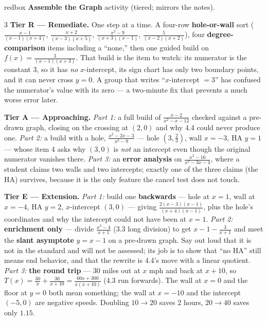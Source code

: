 \documentclass[10pt]{article}
\begin{document}
\begin{skillbox}{redbox}
\textbf{Assemble the Graph} activity (tiered; mirrors the notes).
\begin{multicols}{3}
\textbf{Tier R --- Remediate.} One step at a time. A four-row \textbf{hole-or-wall} sort
($\frac{x-1}{(x-1)(x+4)}$, $\frac{x+2}{(x-3)(x+5)}$, $\frac{x^2-9}{(x+3)(x-1)}$,
$\frac{5}{(x-2)(x+2)}$), four \textbf{degree-comparison} items including a ``none,'' then one guided
build on $f(x)=\frac{3}{(x-1)(x+3)}$. That build is the item to watch: its numerator is the constant
$3$, so it has \emph{no} $x$-intercept, its sign chart has only two boundary points, and it can never
cross $y=0$. A group that writes ``$x$-intercept $=3$'' has confused the numerator's value with its
zero --- a two-minute fix that prevents a much worse error later.

\columnbreak
\textbf{Tier A --- Approaching.} \emph{Part 1:} a full build of $\frac{x-2}{x^2-x-12}$ checked against
a pre-drawn graph, closing on the crossing at $(2,0)$ and why 4.4 could never produce one.
\emph{Part 2:} a build with a hole, $\frac{x^2-2x-3}{x^2-9}$ --- hole $(3,\frac23)$, wall $x=-3$,
HA $y=1$ --- whose item 4 asks why $(3,0)$ is \emph{not} an intercept even though the original
numerator vanishes there. \emph{Part 3:} an \textbf{error analysis} on $\frac{x^2-16}{x^2-3x-4}$, where
a student claims two walls and two intercepts; exactly one of the three claims (the HA) survives,
because it is the only feature the cancel test does not touch.

\columnbreak
\textbf{Tier E --- Extension.} \emph{Part 1:} build one \textbf{backwards} --- hole at $x=1$, wall at
$x=-4$, HA $y=2$, $x$-intercept $(3,0)$ --- giving $\frac{2(x-3)(x-1)}{(x+4)(x-1)}$, plus the hole's
coordinates and why the intercept could not have been at $x=1$. \emph{Part 2:} \textbf{enrichment
only} --- divide $\frac{x^2-4}{x+1}$ (3.3 long division) to get $x-1-\frac{3}{x+1}$ and meet the
\textbf{slant asymptote} $y=x-1$ on a pre-drawn graph. Say out loud that it is not in the standard and
will not be assessed; its job is to show that ``no HA'' still means end behavior, and that the rewrite
is 4.4's move with a linear quotient. \emph{Part 3:} \textbf{the round trip} --- $30$ miles out at $x$
mph and back at $x+10$, so $T(x)=\frac{30}{x}+\frac{30}{x+10}=\frac{60x+300}{x(x+10)}$ (4.3 run
forwards). The wall at $x=0$ and the floor at $y=0$ both mean something; the wall at $x=-10$ and the
intercept $(-5,0)$ are negative speeds. Doubling $10\to20$ saves $2$ hours, $20\to40$ saves only
$1.15$.
\end{multicols}
\end{skillbox}
\end{document}
